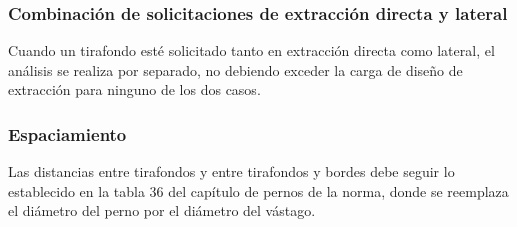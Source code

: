 \subsubsection{Combinación de solicitaciones de extracción directa y lateral}
Cuando un tirafondo esté solicitado tanto en extracción directa como lateral, el análisis se realiza por separado, no debiendo exceder la carga de diseño de extracción para ninguno de los dos casos.

\subsubsection{Espaciamiento}
Las distancias entre tirafondos y entre tirafondos y bordes debe seguir lo establecido en la tabla 36 del capítulo de pernos de la norma, donde se reemplaza el diámetro del perno por el diámetro del vástago.
